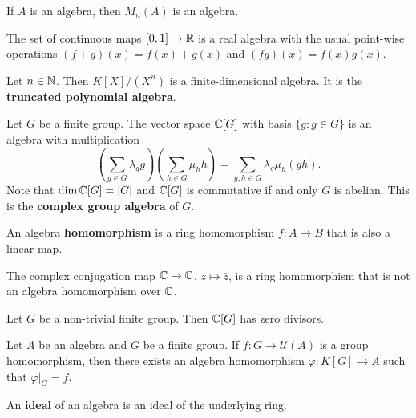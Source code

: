 \begin{example}
	If $A$ is an algebra, then  $M_n(A)$ is an algebra. 
\end{example}

\begin{example}
	The set of continuous maps $[0,1]\to\mathbb{R}$ is a real algebra with the usual
	point-wise operations $(f+g)(x)=f(x)+g(x)$ and $(fg)(x)=f(x)g(x)$. 
\end{example}

\begin{example}
    Let $n\in\mathbb{N}$. Then $K[X]/(X^n)$ is a finite-dimensional algebra. 
    It is the \textbf{truncated polynomial algebra}.  
\end{example}

\begin{example}
	Let $G$ be a finite group. The vector space 
	$\mathbb{C}[G]$ with basis $\{g:g\in G\}$
	is an algebra with multiplication
	\[
	\left(\sum_{g\in G}\lambda_gg\right)\left(\sum_{h\in G}\mu_hh\right)
	=\sum_{g,h\in G}\lambda_g\mu_h(gh).
	\] 	
	Note that $\dim\mathbb{C}[G]=|G|$ and
	$\mathbb{C}[G]$ is commutative if and only $G$ is abelian. 
	This is the \textbf{complex group algebra} of $G$. 
\end{example}

\begin{definition}
    An algebra \textbf{homomorphism} is a ring homomorphism $f\colon A\to B$ that is also a linear map. 
\end{definition}

The complex conjugation map  
$\mathbb{C}\to \mathbb{C}$, $z\mapsto\overline{z}$, is a ring homomorphism that is not an algebra homomorphism over $\mathbb{C}$. 

 
\begin{exercise}
	Let $G$ be a non-trivial finite group. 
	Then $\mathbb{C}[G]$ has zero divisors. 
\end{exercise}

\begin{exercise}
	Let $A$ be an algebra and $G$ be a finite group. 
	If $f\colon G\to\mathcal{U}(A)$ is a group homomorphism, 
	then there exists an algebra homomorphism 
	$\varphi\colon K[G]\to A$ such that $\varphi|_G=f$.   	
\end{exercise}

\begin{definition}
 	An \textbf{ideal} of an algebra is an ideal of the underlying ring.
\end{definition}

